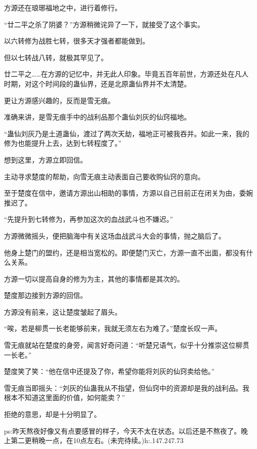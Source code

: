 \begin{this_body}
方源还在琅琊福地之中，进行着修行。

“廿二平之杀了阴婆？”方源稍微诧异了一下，就接受了这个事实。

以六转修为战胜七转，很多天才强者都能做到。

但以七转战八转，就极其罕见了。

廿二平之……在方源的记忆中，并无此人印象。毕竟五百年前世，方源还处在凡人时期，对这个时间段的蛊仙界，还是北原蛊仙界并不太清楚。

更让方源感兴趣的，反而是雪无痕。

准确来讲，是雪无痕手中的战利品那个蛊仙刘灰的仙窍福地。

“蛊仙刘灰乃是土道蛊仙，渡过了两次天劫，福地正可被我吞并。如此一来，我的修为也能提升上去，达到七转程度了。”

想到这里，方源立即回信。

主动寻求楚度的帮助，向雪无痕主动表面自己要收购仙窍的意向。

至于楚度在信中，邀请方源出山相助的事情，方源以自己目前正在闭关为由，委婉推迟了。

“先提升到七转修为，再参加这次的血战武斗也不嫌迟。”

方源微微摇头，便把脑海中有关这场血战武斗大会的事情，抛之脑后了。

他身上楚门的盟约，还是相当宽松的。即便楚门灭亡，方源一直不出面，都没有什么关系。

方源一切以提高自身的修为为主，其他的事情都是其次的。

楚度那边接到方源的回信。

方源没有前来，这让楚度皱起了眉头。

“唉，若是柳贯一长老能够前来，我就无须左右为难了。”楚度长叹一声。

雪无痕就站在楚度的身旁，闻言好奇问道：“听楚兄语气，似乎十分推崇这位柳贯一长老。”

楚度笑了笑：“他在信中还提及了你，希望你能将刘灰的仙窍卖给他。”

雪无痕当即摇头：“刘灰的仙蛊我从不指望，但仙窍中的资源却是我的战利品。我根本不知道这里面的价值，如何能卖？”

拒绝的意思，却是十分明显了。

ps:昨天熬夜好像又有点要感冒的样子，今天不太在状态。以后还是不熬夜了。晚上第二更稍晚一点，在10点左右。(未完待续。)h:.147.247.73

\end{this_body}

